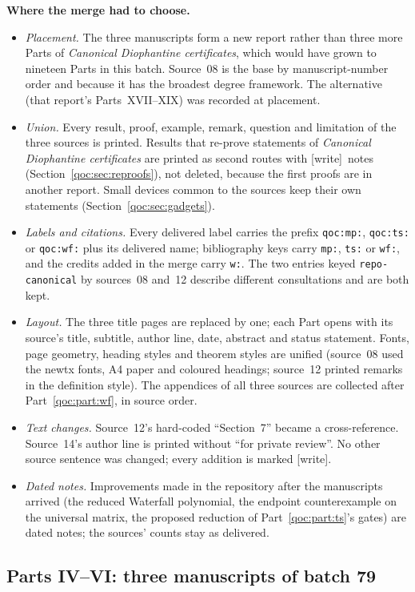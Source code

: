 \documentclass[11pt,letterpaper]{article}
\theoremstyle{definition}
\theoremstyle{remark}
\newcommand{\wtag}{\textup{[write]}}
\begin{document}
\textbf{Where the merge had to choose.}
\begin{itemize}
\item \emph{Placement.} The three manuscripts form a new report rather than three more Parts of \emph{Canonical Diophantine certificates}, which would have grown to nineteen Parts in this batch. Source~08 is the base by manuscript-number order and because it has the broadest degree framework. The alternative (that report's Parts~XVII--XIX) was recorded at placement.
\item \emph{Union.} Every result, proof, example, remark, question and limitation of the three sources is printed. Results that re-prove statements of \emph{Canonical Diophantine certificates} are printed as second routes with \wtag\ notes (Section~\ref{qoc:sec:reproofs}), not deleted, because the first proofs are in another report. Small devices common to the sources keep their own statements (Section~\ref{qoc:sec:gadgets}).
\item \emph{Labels and citations.} Every delivered label carries the prefix \texttt{qoc:mp:}, \texttt{qoc:ts:} or \texttt{qoc:wf:} plus its delivered name; bibliography keys carry \texttt{mp:}, \texttt{ts:} or \texttt{wf:}, and the credits added in the merge carry \texttt{w:}. The two entries keyed \texttt{repo-canonical} by sources~08 and~12 describe different consultations and are both kept.
\item \emph{Layout.} The three title pages are replaced by one; each Part opens with its source's title, subtitle, author line, date, abstract and status statement. Fonts, page geometry, heading styles and theorem styles are unified (source~08 used the newtx fonts, A4 paper and coloured headings; source~12 printed remarks in the definition style). The appendices of all three sources are collected after Part~\ref{qoc:part:wf}, in source order.
\item \emph{Text changes.} Source~12's hard-coded ``Section~7'' became a cross-reference. Source~14's author line is printed without ``for private review''. No other source sentence was changed; every addition is marked \wtag.
\item \emph{Dated notes.} Improvements made in the repository after the manuscripts arrived (the reduced Waterfall polynomial, the endpoint counterexample on the universal matrix, the proposed reduction of Part~\ref{qoc:part:ts}'s gates) are dated notes; the sources' counts stay as delivered.
\end{itemize}

\subsection{Parts IV--VI: three manuscripts of batch 79}\label{qoc:mm:app:provenance79}
\end{document}

